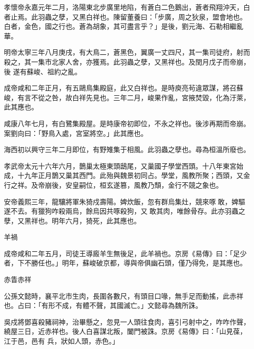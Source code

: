 \begin{pinyinscope}
 孝懷帝永嘉元年二月，洛陽東北步廣里地陷，有蒼白二色鵝出，蒼者飛翔沖天，白者止焉。此羽蟲之孽，又黑白祥也。陳留董養曰：「步廣，周之狄泉，盟會地也。白者，金色，國之行也。蒼為胡象，其可盡言乎？」是後，劉元海、石勒相繼亂華。



 明帝太寧三年八月庚戌，有大鳥二，蒼黑色，翼廣一丈四尺，其一集司徒府，射而殺之，其一集市北家人舍，亦獲焉。此羽蟲之孽，又黑祥也。及閏月戊子而帝崩，後
 遂有蘇峻、祖約之亂。



 成帝咸和二年正月，有五鷗鳥集殿庭，此又白祥也。是時庾亮茍違眾謀，將召蘇峻，有言不從之咎，故白祥先見也。三年二月，峻果作亂，宮掖焚毀，化為汙萊，此其應也。



 咸康八年七月，有白鷺集殿屋。是時康帝初即位，不永之祥也。後涉再期而帝崩。案劉向曰：「野鳥入處，宮室將空。」此其應也。



 海西初以興守三年二月即位，有野雉集于相風。此羽蟲之孽也。尋為桓溫所廢也。



 孝武帝太元十六年六月，鵲巢太極東頭鴟尾，又巢國子學堂西頭。十八年東宮始成，十九年正月鵲又巢其西門。此殆與魏景初同占。學堂，風教所聚；西頭，又金行之祥。及帝崩後，安皇嗣位，桓玄遂篡，風教乃頹，金行不競之象也。



 安帝義熙三年，龍驤將軍朱猗戍壽陽。婢炊飯，忽有群烏集灶，競來啄敢，婢驅遂不去。有獵狗咋殺兩烏，餘烏因共啄殺狗，又敢其肉，唯餘骨存。此亦羽蟲之孽，又黑祥也。明年六月，猗死，此其應也。



 羊禍



 成帝咸和二年五月，司徒王導廄羊生無後足，此羊禍也。京房《易傳》曰：「足少者，下不勝任也。」明年，蘇峻破京都，導與帝俱幽石頭，僅乃得免，是其應也。



 赤眚赤祥



 公孫文懿時，襄平北市生肉，長圍各數尺，有頭目口喙，無手足而動搖，此赤祥也。占曰：「有形不成，有體不聲，其國滅亡。」文懿尋為魏所誅。



 吳戍將鄧喜殺豬祠神，治畢懸之，忽見一人頭往食肉，喜引弓射中之，咋咋作聲，繞屋三日，近赤祥也。後人白喜謀北叛，闔門被誅。京房《易傳》曰：「山見葆，江于邑，邑有
 兵，狀如人頭，赤色。」




\end{pinyinscope}
